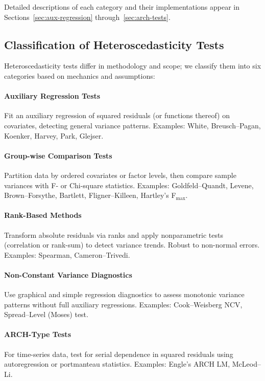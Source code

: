 Detailed descriptions of each category and their implementations appear in Sections~\ref{sec:aux-regression} through~\ref{sec:arch-tests}.


\subsection{Classification of Heteroscedasticity Tests}\label{sec:classification}
Heteroscedasticity tests differ in methodology and scope; we classify them into six categories based on mechanics and assumptions:

\paragraph{Auxiliary Regression Tests} Fit an auxiliary regression of squared residuals (or functions thereof) on covariates, detecting general variance patterns. Examples: White, Breusch--Pagan, Koenker, Harvey, Park, Glejser.

\paragraph{Group-wise Comparison Tests} Partition data by ordered covariates or factor levels, then compare sample variances with F- or Chi-square statistics. Examples: Goldfeld--Quandt, Levene, Brown--Forsythe, Bartlett, Fligner--Killeen, Hartley’s F$_{\max}$. 

\paragraph{Rank-Based Methods} Transform absolute residuals via ranks and apply nonparametric tests (correlation or rank-sum) to detect variance trends. Robust to non-normal errors. Examples: Spearman, Cameron--Trivedi.

\paragraph{Non-Constant Variance Diagnostics} Use graphical and simple regression diagnostics to assess monotonic variance patterns without full auxiliary regressions. Examples: Cook--Weisberg NCV, Spread–Level (Moses) test.

\paragraph{ARCH-Type Tests} For time-series data, test for serial dependence in squared residuals using autoregression or portmanteau statistics. Examples: Engle’s ARCH LM, McLeod–Li.

